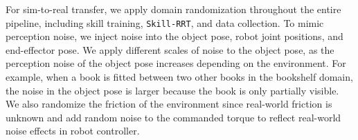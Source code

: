 For sim-to-real transfer, we apply domain randomization throughout the entire pipeline, including skill training, \texttt{Skill-RRT}, and data collection. To mimic perception noise, we inject noise into the object pose, robot joint positions, and end-effector pose. We apply different scales of noise to the object pose, as the perception noise of the object pose increases depending on the environment. For example, when a book is fitted between two other books in the bookshelf domain, the noise in the object pose is larger because the book is only partially visible. We also randomize the friction of the environment since real-world friction is unknown and add random noise to the commanded torque to reflect real-world noise effects in robot controller.

% 